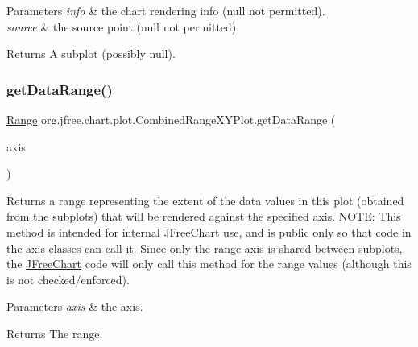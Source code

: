 \begin{DoxyParams}{Parameters}
{\em info} & the chart rendering info ({\ttfamily null} not permitted). \\
\hline
{\em source} & the source point ({\ttfamily null} not permitted).\\
\hline
\end{DoxyParams}
\begin{DoxyReturn}{Returns}
A subplot (possibly {\ttfamily null}). 
\end{DoxyReturn}
\mbox{\label{classorg_1_1jfree_1_1chart_1_1plot_1_1_combined_range_x_y_plot_af8ecace356fe3b8cf664bf3f2a48742f}} 
\subsubsection{\texorpdfstring{get\+Data\+Range()}{getDataRange()}}
{\footnotesize\ttfamily \mbox{\hyperlink{classorg_1_1jfree_1_1data_1_1_range}{Range}} org.\+jfree.\+chart.\+plot.\+Combined\+Range\+X\+Y\+Plot.\+get\+Data\+Range (\begin{DoxyParamCaption}\item[{\mbox{\hyperlink{classorg_1_1jfree_1_1chart_1_1axis_1_1_value_axis}{Value\+Axis}}}]{axis }\end{DoxyParamCaption})}

Returns a range representing the extent of the data values in this plot (obtained from the subplots) that will be rendered against the specified axis. N\+O\+TE\+: This method is intended for internal \mbox{\hyperlink{classorg_1_1jfree_1_1chart_1_1_j_free_chart}{J\+Free\+Chart}} use, and is public only so that code in the axis classes can call it. Since only the range axis is shared between subplots, the \mbox{\hyperlink{classorg_1_1jfree_1_1chart_1_1_j_free_chart}{J\+Free\+Chart}} code will only call this method for the range values (although this is not checked/enforced).


\begin{DoxyParams}{Parameters}
{\em axis} & the axis.\\
\hline
\end{DoxyParams}
\begin{DoxyReturn}{Returns}
The range. 
\end{DoxyReturn}


